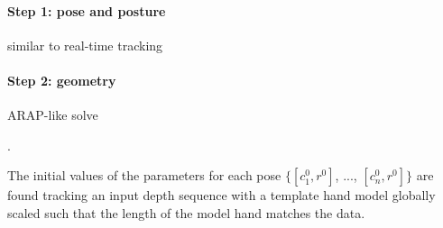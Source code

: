 \paragraph{Step 1: pose and posture}
similar to real-time tracking
\paragraph{Step 2: geometry}
ARAP-like solve

.

\begin{DRAFT}
The initial values of the parameters for each pose  $\{[c^0_1 , r^0]$, ..., $[c^0_n, r^0]\}$ are found tracking an input depth sequence with a template hand model globally scaled such that the length of the model hand matches the data.
\end{DRAFT}

\endinput



